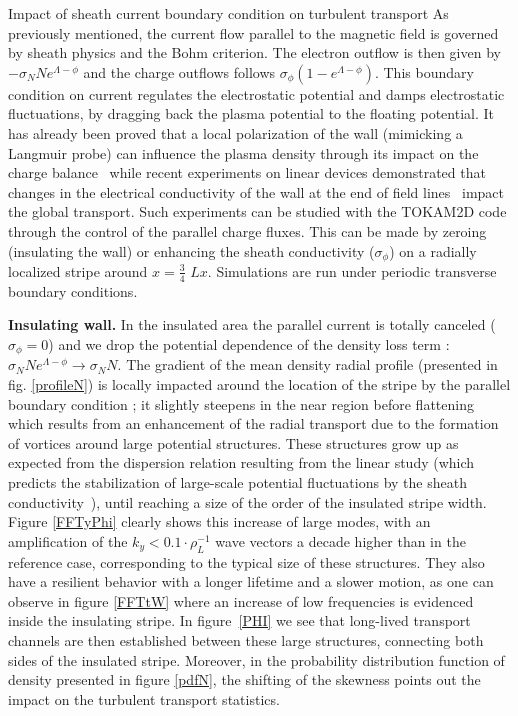 \documentclass[a4paper,12pt]{article} %
\begin{document}
\begin{section}{Impact of sheath current boundary condition on turbulent transport}
As previously mentioned, the current flow parallel to the magnetic field is governed by sheath physics and the Bohm 
criterion. The electron outflow is then given by $\nonumber -\sigma_N N e^{\Lambda-\phi}$
and the charge outflows follows $\nonumber \sigma_\phi(1-e^{\Lambda-\phi})$.  This boundary condition on current
regulates the electrostatic potential and damps electrostatic fluctuations, by dragging back the plasma 
potential to the floating potential. It has already been proved that a local polarization of the wall 
(mimicking a Langmuir probe)
can influence the plasma density through its impact on the charge balance~\cite{Ghendrih} while recent experiments 
on linear devices demonstrated that changes in the electrical conductivity of the wall at the end of 
field lines~\cite{UCSD} impact the global transport. 
Such experiments can be studied with the TOKAM2D code through the control of the parallel charge fluxes. 
This can be made by zeroing (insulating the wall) or enhancing the sheath conductivity ($\sigma_\phi$) on 
a radially localized stripe around $x=\frac{3}{4}\text{~}Lx$. Simulations are run under periodic transverse boundary conditions.

\textbf{Insulating wall.}
In the insulated area the parallel current is totally canceled ($\sigma_\phi=0$) and we drop the potential dependence
of the density loss term : $\sigma_N N e^{\Lambda-\phi}\rightarrow\sigma_N N$. The gradient of the mean density radial profile (presented in fig. \ref{profileN}) is 
locally impacted around the location of the stripe by the parallel boundary condition ; it slightly steepens 
in the near region before flattening
which results from an enhancement of the radial transport due to the formation of vortices around large potential 
structures. These structures grow up as expected 
from the dispersion relation resulting from the linear study (which predicts the stabilization of large-scale 
potential fluctuations by the sheath conductivity~\cite{Sarazin}), until reaching a size of the order of the 
insulated stripe width.
Figure \ref{FFTyPhi} clearly shows this increase of large modes, with an amplification of the $k_y<0.1\cdot\rho_L^{-1}$ 
wave vectors
 a decade higher than in the reference case, corresponding to the typical size of these structures. They also have 
a resilient behavior with a longer lifetime and a slower motion, as one can observe in figure \ref{FFTtW} where 
an increase of low frequencies is evidenced inside the insulating stripe. In figure~\ref{PHI} we see that long-lived transport channels are then established between 
these large structures, connecting both sides of the insulated stripe. Moreover, in the probability distribution 
function of density presented in figure 
\ref{pdfN}, the shifting of the skewness points out the impact on the turbulent transport statistics. 


\end{section}
\end{document}
